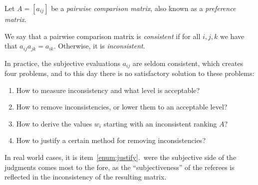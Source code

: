 \begin{frame}
Let $A=[a_{ij}]$ be a {\em pairwise comparison matrix}, also known as
a {\em preference matrix}. 

We say that a pairwise comparison matrix is
{\em consistent} if for all $i,j,k$ we have that $a_{ij}a_{jk}=a_{ik}$.
Otherwise, it is {\em inconsistent}.
\end{frame}

\begin{frame}
In practice, the subjective evaluations $a_{ij}$ are seldom
consistent, which creates four problems, and to
this day there is no satisfactory solution to these problems:
\begin{enumerate}
\item How to measure inconsistency and what level is acceptable?
\item How to remove inconsistencies, or lower them to an acceptable
level?
\item How to derive the values $w_i$ starting with an inconsistent
ranking $A$?
\item\label{enum:justify} How to justify a certain method for removing
inconsistencies?  
\end{enumerate}
In real world cases, it is item~\ref{enum:justify}.\ were the
subjective side of the judgments comes most to the fore, as the
``subjectiveness'' of the referees is reflected in the inconsistency
of the resulting matrix.

\end{frame}


